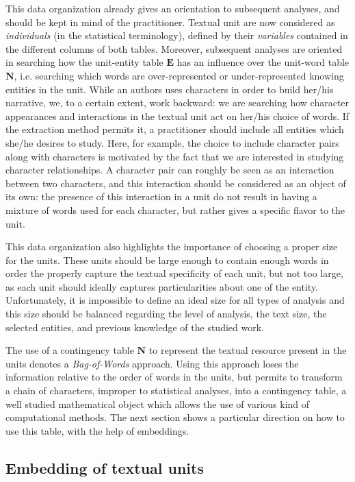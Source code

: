 \documentclass[
twocolumn,
]{ceurart}
\begin{document}
This data organization already gives an orientation to subsequent analyses, and should be kept in mind of the practitioner. Textual unit are now considered as \emph{individuals} (in the statistical terminology), defined by their \emph{variables} contained in the different columns of both tables. Moreover, subsequent analyses are oriented in searching how the unit-entity table $\mathbf{E}$ has an influence over the unit-word table $\mathbf{N}$, i.e. searching which words are over-represented or under-represented knowing entities in the unit. While an authors uses characters in order to build her/his narrative, we, to a certain extent, work backward: we are searching how character appearances and interactions in the textual unit act on her/his choice of words. If the extraction method permits it, a practitioner should include all entities which she/he desires to study. Here, for example, the choice to include character pairs along with characters is motivated by the fact that we are interested in studying character relationships. A character pair can roughly be seen as an interaction between two characters, and this interaction should be considered as an object of its own: the presence of this interaction in a unit do not result in having a mixture of words used for each character, but rather gives a specific flavor to the unit. 

This data organization also highlights the importance of choosing a proper size for the units. These units should be large enough to contain enough words in order the properly capture the textual specificity of each unit, but not too large, as each unit should ideally captures particularities about one of the entity. Unfortunately, it is impossible to define an ideal size for all types of analysis and this size should be balanced regarding the level of analysis, the text size, the selected entities, and previous knowledge of the studied work.

The use of a contingency table $\mathbf{N}$ to represent the textual resource present in the units denotes a \emph{Bag-of-Words} approach. Using this approach loses the information relative to the order of words in the units, but permits to transform a chain of characters, improper to statistical analyses, into a contingency table, a well studied mathematical object which allows the use of various kind of computational methods. The next section shows a particular direction on how to use this table, with the help of embeddings.

\subsection{Embedding of textual units}
\label{unit_embeddings}
\end{document}
